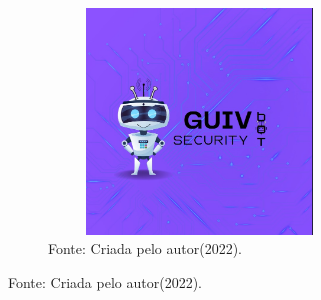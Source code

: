 \begin{figure}[!htb]
\centering
\captionsetup[subfigure]{labelformat=empty}
\caption{``GUIV''}
\begin{subfigure}{.5\textwidth}
\centering
\includegraphics[width=8cm,height=6cm]{Bot/Partes/Imagens/Guiv S.jpeg}
\caption{Fonte: Criada pelo autor(2022).}
\end{subfigure}%
\end{figure}

